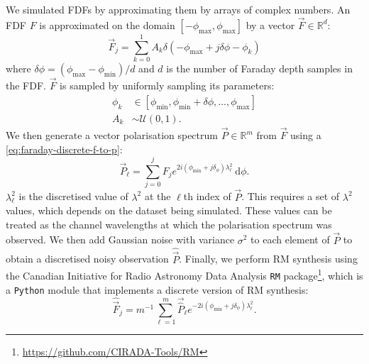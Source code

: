   We simulated FDFs by approximating them by arrays of complex numbers. An FDF $F$ is approximated on the domain $[-\phi_{\max}, \phi_{\max}]$ by a vector $\vec F \in \mathbb R^d$:
    \begin{equation}
      \label{eq:faraday-vec-f}
      \vec F_j = \sum_{k = 0}^1 A_k \delta(-\phi_{\max} + j \delta \phi - \phi_k)
    \end{equation}
    where $\delta\phi = (\phi_{\max} - \phi_{\min}) / d$ and $d$ is the number of Faraday depth samples in the FDF.
    $\vec F$ is sampled by uniformly sampling its parameters:
    \begin{align}
      \label{eq:faraday-model-distributions}
      \phi_k &\in [\phi_{\min}, \phi_{\min} + \delta\phi, \dots, \phi_{\max}]\\
      A_k &\sim \mathcal U(0, 1).
    \end{align}
    We then generate a vector polarisation spectrum $\vec P \in \mathbb R^m$ from $\vec F$ using a \autoref{eq:faraday-discrete-f-to-p}:
    \begin{equation}
      \label{eq:faraday-discrete-f-to-p}
      \vec P_\ell = \sum_{j = 0}^{j} F_j e^{2i(\phi_{\min} + j\delta_\phi)\lambda^2_\ell}\ \mathrm{d}\phi.
    \end{equation}
    $\lambda^2_\ell$ is the discretised value of $\lambda^2$ at the $\ell$th index of $\vec P$. This requires a set of $\lambda^2$ values, which depends on the dataset being simulated. These values can be treated as the channel wavelengths at which the polarisation spectrum was observed. We then add Gaussian noise with variance $\sigma^2$ to each element of $\vec P$ to obtain a discretised noisy observation $\hat{\vec{P}}$. Finally, we perform RM synthesis using the Canadian Initiative for Radio Astronomy Data Analysis \texttt{RM} package\footnote{\url{https://github.com/CIRADA-Tools/RM}}, which is a \texttt{Python} module that implements a discrete version of RM synthesis:
    \begin{equation}
      \label{eq:faraday-discrete-rm-synthesis}
      \hat{\vec{F}}_j = m^{-1} \sum_{\ell = 1}^m \vec{\hat P}_\ell e^{-2i(\phi_{\min} + j\delta_\phi)\lambda^2_\ell}.
    \end{equation}

